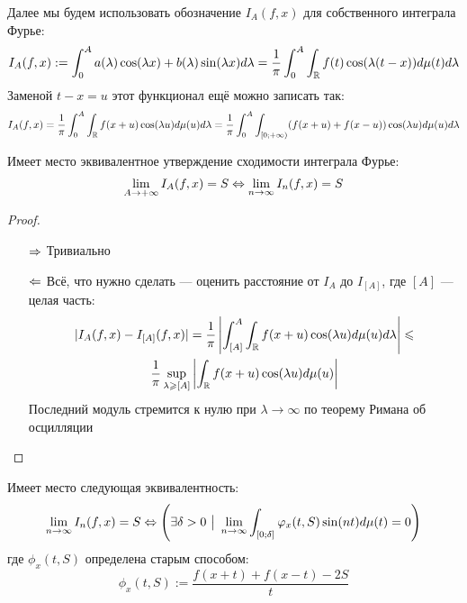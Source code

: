 \begin{note}
	Далее мы будем использовать обозначение $I_A(f, x)$ для собственного интеграла Фурье:
	\[
		I_A(f, x) := \int_0^A a(\lambda)\cos(\lambda x) + b(\lambda)\sin(\lambda x)d\lambda = \frac{1}{\pi} \int_0^A \int_{\mathbb{R}} f(t)\cos(\lambda(t - x))d\mu(t)d\lambda
	\]
	Заменой $t - x = u$ этот функционал ещё можно записать так:
	\[
		I_A(f, x) = \frac{1}{\pi} \int_0^A \int_{\mathbb{R}} f(x + u)\cos(\lambda u)d\mu(u)d\lambda = \frac{1}{\pi} \int_0^A \int_{\left[0; +\infty\right)} (f(x + u) + f(x - u))\cos(\lambda u)d\mu(u)d\lambda
	\]
\end{note}

\begin{lemma}
	Имеет место эквивалентное утверждение сходимости интеграла Фурье:
	\[
		\lim_{A \to +\infty} I_A(f, x) = S \Leftrightarrow \lim_{n \to \infty} I_n(f, x) = S
	\]
\end{lemma}

\begin{proof}~
	\begin{itemize}
		\item[$\Rightarrow$] Тривиально
		
		\item[$\Leftarrow$] Всё, что нужно сделать --- оценить расстояние от $I_A$ до $I_{[A]}$, где $[A]$ --- целая часть:
		\begin{multline*}
			|I_A(f, x) - I_{[A]}(f, x)| = \frac{1}{\pi} \left|\int_{[A]}^A \int_{\mathbb{R}} f(x + u)\cos(\lambda u)d\mu(u)d\lambda\right| \leqslant
			\\
			\frac{1}{\pi} \sup_{\lambda \geqslant [A]} \left|\int_{\mathbb{R}} f(x + u)\cos(\lambda u)d\mu(u)\right|
		\end{multline*}
		Последний модуль стремится к нулю при $\lambda \to \infty$ по теорему Римана об осцилляции
	\end{itemize}
\end{proof}

\begin{lemma}
	Имеет место следующая эквивалентность:
	\[
		\lim_{n \to \infty} I_n(f, x) = S \Leftrightarrow \left(\exists \delta > 0 \ \big|\  \lim_{n \to \infty} \int_{[0; \delta]} \varphi_x(t, S)\sin(nt)d\mu(t) = 0\right)
	\]
	где $\phi_x(t, S)$ определена старым способом:
	\[
		\phi_x(t, S) := \frac{f(x + t) + f(x - t) - 2S}{t}
	\]
\end{lemma}

